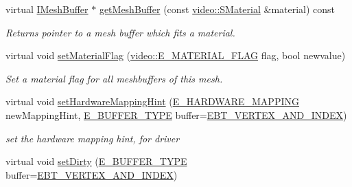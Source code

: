\begin{DoxyCompactItemize}
virtual \hyperlink{classirr_1_1scene_1_1IMeshBuffer}{I\+Mesh\+Buffer} $\ast$ \hyperlink{structirr_1_1scene_1_1SAnimatedMesh_a3c010c881f315e56a05f40632f3c7f79}{get\+Mesh\+Buffer} (const \hyperlink{classirr_1_1video_1_1SMaterial}{video\+::\+S\+Material} \&material) const
\begin{DoxyCompactList}\small\item\em Returns pointer to a mesh buffer which fits a material. \end{DoxyCompactList}\item 
\mbox{\label{structirr_1_1scene_1_1SAnimatedMesh_aefe38066b9c38c6d4ea522b5d988769e}} 
virtual void \hyperlink{structirr_1_1scene_1_1SAnimatedMesh_aefe38066b9c38c6d4ea522b5d988769e}{set\+Material\+Flag} (\hyperlink{namespaceirr_1_1video_a8a3bc00ae8137535b9fbc5f40add70d3}{video\+::\+E\+\_\+\+M\+A\+T\+E\+R\+I\+A\+L\+\_\+\+F\+L\+AG} flag, bool newvalue)
\begin{DoxyCompactList}\small\item\em Set a material flag for all meshbuffers of this mesh. \end{DoxyCompactList}\item 
\mbox{\label{structirr_1_1scene_1_1SAnimatedMesh_a69448fa91bd1c6316d11d9ae3b8b88e6}} 
virtual void \hyperlink{structirr_1_1scene_1_1SAnimatedMesh_a69448fa91bd1c6316d11d9ae3b8b88e6}{set\+Hardware\+Mapping\+Hint} (\hyperlink{namespaceirr_1_1scene_ac7d8ee8d77da75f2580bb9bb17231c27}{E\+\_\+\+H\+A\+R\+D\+W\+A\+R\+E\+\_\+\+M\+A\+P\+P\+I\+NG} new\+Mapping\+Hint, \hyperlink{namespaceirr_1_1scene_a8f59a89ffef0ad8e5b2c2cb874a93e8c}{E\+\_\+\+B\+U\+F\+F\+E\+R\+\_\+\+T\+Y\+PE} buffer=\hyperlink{namespaceirr_1_1scene_a8f59a89ffef0ad8e5b2c2cb874a93e8ca34ea664123fbc28610408e51b014dcdd}{E\+B\+T\+\_\+\+V\+E\+R\+T\+E\+X\+\_\+\+A\+N\+D\+\_\+\+I\+N\+D\+EX})
\begin{DoxyCompactList}\small\item\em set the hardware mapping hint, for driver \end{DoxyCompactList}\item 
\mbox{\label{structirr_1_1scene_1_1SAnimatedMesh_a415b9404cee43f2f460ebb32724d7793}} 
virtual void \hyperlink{structirr_1_1scene_1_1SAnimatedMesh_a415b9404cee43f2f460ebb32724d7793}{set\+Dirty} (\hyperlink{namespaceirr_1_1scene_a8f59a89ffef0ad8e5b2c2cb874a93e8c}{E\+\_\+\+B\+U\+F\+F\+E\+R\+\_\+\+T\+Y\+PE} buffer=\hyperlink{namespaceirr_1_1scene_a8f59a89ffef0ad8e5b2c2cb874a93e8ca34ea664123fbc28610408e51b014dcdd}{E\+B\+T\+\_\+\+V\+E\+R\+T\+E\+X\+\_\+\+A\+N\+D\+\_\+\+I\+N\+D\+EX})

\end{DoxyCompactItemize}
